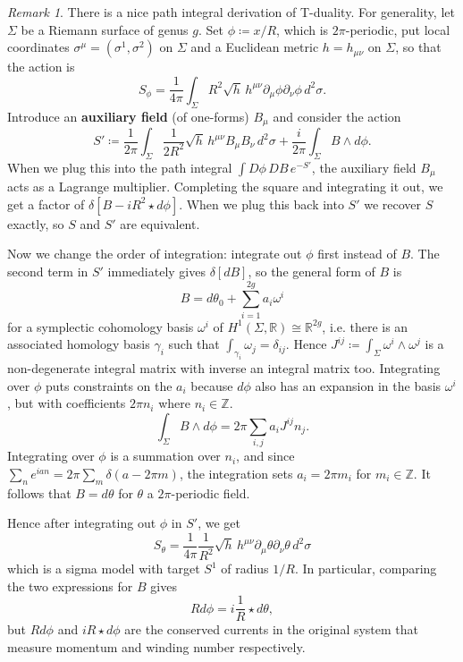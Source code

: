\documentclass{report}
\theoremstyle{plain}
\theoremstyle{definition}
\theoremstyle{remark}
\newtheorem*{remark}{Remark}
\newcommand{\di}{\partial}
\newcommand{\bR}{\mathbb{R}}
\newcommand{\bZ}{\mathbb{Z}}
\begin{document}
\begin{remark}
  There is a nice path integral derivation of T-duality. For
  generality, let $\Sigma$ be a Riemann surface of genus $g$. Set
  $\phi \coloneqq x/R$, which is $2\pi$-periodic, put local
  coordinates $\sigma^\mu = (\sigma^1, \sigma^2)$ on $\Sigma$ and a
  Euclidean metric $h = h_{\mu\nu}$ on $\Sigma$, so that the action is
  \[ S_\phi = \frac{1}{4\pi} \int_\Sigma R^2 \sqrt{h} \, h^{\mu\nu} \di_\mu \phi \di_\nu \phi \, d^2\sigma. \]
  Introduce an {\bf auxiliary field} (of one-forms) $B_\mu$ and
  consider the action
  \[ S' \coloneqq \frac{1}{2\pi} \int_\Sigma \frac{1}{2R^2} \sqrt{h} \, h^{\mu\nu} B_\mu B_\nu \, d^2\sigma + \frac{i}{2\pi} \int_\Sigma B \wedge d\phi. \]
  When we plug this into the path integral $\int D\phi \, DB\,
  e^{-S'}$, the auxiliary field $B_\mu$ acts as a Lagrange multiplier.
  Completing the square and integrating it out, we get a factor of
  $\delta[B - iR^2 \star d\phi]$. When we plug this back into $S'$ we
  recover $S$ exactly, so $S$ and $S'$ are equivalent.

  Now we change the order of integration: integrate out $\phi$ first
  instead of $B$. The second term in $S'$ immediately gives
  $\delta[dB]$, so the general form of $B$ is
  \[ B = d\theta_0 + \sum_{i=1}^{2g} a_i \omega^i \]
  for a symplectic cohomology basis $\omega^i$ of $H^1(\Sigma, \bR)
  \cong \bR^{2g}$, i.e. there is an associated homology basis
  $\gamma_i$ such that $\int_{\gamma_i} \omega_j = \delta_{ij}$. Hence
  $J^{ij} \coloneqq \int_\Sigma \omega^i \wedge \omega^j$ is a
  non-degenerate integral matrix with inverse an integral matrix too.
  Integrating over $\phi$ puts constraints on the $a_i$ because
  $d\phi$ also has an expansion in the basis $\omega^i$, but with
  coefficients $2\pi n_i$ where $n_i \in \bZ$.
  \[ \int_\Sigma B \wedge d\phi = 2\pi \sum_{i,j} a_i J^{ij} n_j. \]
  Integrating over $\phi$ is a summation over $n_i$, and since $\sum_n
  e^{ian} = 2\pi \sum_m \delta(a - 2\pi m)$, the integration sets $a_i
  = 2\pi m_i$ for $m_i \in \bZ$. It follows that $B = d\theta$ for
  $\theta$ a $2\pi$-periodic field.

  Hence after integrating out $\phi$ in $S'$, we get
  \[ S_\theta = \frac{1}{4\pi} \frac{1}{R^2} \sqrt{h} \, h^{\mu\nu} \di_\mu \theta \di_\nu \theta \, d^2\sigma \]
  which is a sigma model with target $S^1$ of radius $1/R$. In
  particular, comparing the two expressions for $B$ gives
  \[ R d\phi = i\frac{1}{R} \star d\theta, \]
  but $Rd\phi$ and $iR\star d\phi$ are the conserved currents in the
  original system that measure momentum and winding number
  respectively.
\end{remark}
\end{document}

